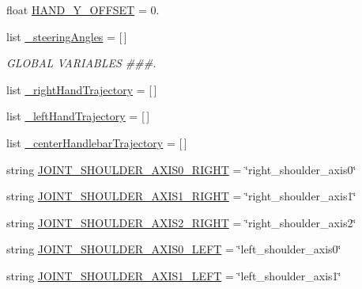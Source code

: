 \begin{DoxyCompactItemize}
\item 
float \mbox{\hyperlink{namespacesteering__capture__multiple__trajectories_a3933eb9e16f7a32da3622a7bc4bac011}{H\+A\+N\+D\+\_\+\+Y\+\_\+\+O\+F\+F\+S\+ET}} = 0.
\item 
list \mbox{\hyperlink{namespacesteering__capture__multiple__trajectories_a55f3e2d0281ef84f632bf30832d11fab}{\+\_\+steering\+Angles}} = \mbox{[}$\,$\mbox{]}
\begin{DoxyCompactList}\small\item\em G\+L\+O\+B\+AL V\+A\+R\+I\+A\+B\+L\+ES \#\#\#. \end{DoxyCompactList}\item 
list \mbox{\hyperlink{namespacesteering__capture__multiple__trajectories_a973fbdc2e2bfa222ac380573be72fa08}{\+\_\+right\+Hand\+Trajectory}} = \mbox{[}$\,$\mbox{]}
\item 
list \mbox{\hyperlink{namespacesteering__capture__multiple__trajectories_ac33475cba15ad6c9c554abaeaf8a5266}{\+\_\+left\+Hand\+Trajectory}} = \mbox{[}$\,$\mbox{]}
\item 
list \mbox{\hyperlink{namespacesteering__capture__multiple__trajectories_a45e7234084b314319955e1cc12809cd8}{\+\_\+center\+Handlebar\+Trajectory}} = \mbox{[}$\,$\mbox{]}
\item 
string \mbox{\hyperlink{namespacesteering__capture__multiple__trajectories_a6f0b5571039be6646a4a656a54d8eb37}{J\+O\+I\+N\+T\+\_\+\+S\+H\+O\+U\+L\+D\+E\+R\+\_\+\+A\+X\+I\+S0\+\_\+\+R\+I\+G\+HT}} = \char`\"{}right\+\_\+shoulder\+\_\+axis0\char`\"{}
\item 
string \mbox{\hyperlink{namespacesteering__capture__multiple__trajectories_afd78072ee43debf3797143a97d551acd}{J\+O\+I\+N\+T\+\_\+\+S\+H\+O\+U\+L\+D\+E\+R\+\_\+\+A\+X\+I\+S1\+\_\+\+R\+I\+G\+HT}} = \char`\"{}right\+\_\+shoulder\+\_\+axis1\char`\"{}
\item 
string \mbox{\hyperlink{namespacesteering__capture__multiple__trajectories_ad9e8863759901d1239b94edad66900e6}{J\+O\+I\+N\+T\+\_\+\+S\+H\+O\+U\+L\+D\+E\+R\+\_\+\+A\+X\+I\+S2\+\_\+\+R\+I\+G\+HT}} = \char`\"{}right\+\_\+shoulder\+\_\+axis2\char`\"{}
\item 
string \mbox{\hyperlink{namespacesteering__capture__multiple__trajectories_a536386527d4d7bd82b5525628600903e}{J\+O\+I\+N\+T\+\_\+\+S\+H\+O\+U\+L\+D\+E\+R\+\_\+\+A\+X\+I\+S0\+\_\+\+L\+E\+FT}} = \char`\"{}left\+\_\+shoulder\+\_\+axis0\char`\"{}
\item 
string \mbox{\hyperlink{namespacesteering__capture__multiple__trajectories_ad118834a76677368da4f3466dd5f04fb}{J\+O\+I\+N\+T\+\_\+\+S\+H\+O\+U\+L\+D\+E\+R\+\_\+\+A\+X\+I\+S1\+\_\+\+L\+E\+FT}} = \char`\"{}left\+\_\+shoulder\+\_\+axis1\char`\"{}

\end{DoxyCompactItemize}
